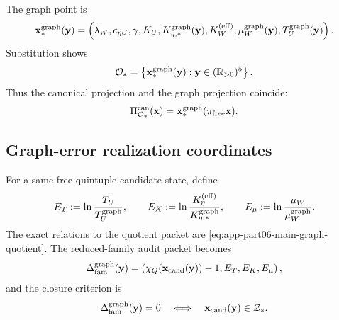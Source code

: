 The graph point is
\begin{equation}
\label{eq:app-part06-x-graph-def}
\mathbf x_*^{\rm graph}(\mathbf y)
=
\left(
\lambda_W,
 c_{\eta U},
 \gamma,
 K_U,
 K_{\eta,*}^{\rm graph}(\mathbf y),
 K_W^{(\mathrm{eff})},
 \mu_W^{\rm graph}(\mathbf y),
 T_U^{\rm graph}(\mathbf y)
\right).
\end{equation}
Substitution shows
\begin{equation}
\label{eq:app-part06-Ostar-graph}
\mathcal O_*=
\left\{
\mathbf x_*^{\rm graph}(\mathbf y):\mathbf y\in(\mathbb R_{>0})^5
\right\}.
\end{equation}
Thus the canonical projection and the graph projection coincide:
\begin{equation}
\label{eq:app-part06-can-equals-graph}
\Pi_{\mathcal O_*}^{\rm can}(\mathbf x)
=
\mathbf x_*^{\rm graph}(\pi_{\rm free}\mathbf x).
\end{equation}

\subsection{Graph-error realization coordinates}
\label{subsec:app-part06-graph-error-realization-coordinates}

For a same-free-quintuple candidate state, define
\begin{equation}
\label{eq:app-part06-graph-errors-def}
E_T:=\ln\frac{T_U}{T_U^{\rm graph}},
\qquad
E_K:=\ln\frac{K_\eta^{(\mathrm{eff})}}{K_{\eta,*}^{\rm graph}},
\qquad
E_\mu:=\ln\frac{\mu_W}{\mu_W^{\rm graph}}.
\end{equation}
The exact relations to the quotient packet are \eqref{eq:app-part06-main-graph-quotient}.  The reduced-family audit packet becomes
\begin{equation}
\label{eq:app-part06-graph-family-packet}
\Delta_{\rm fam}^{\rm graph}(\mathbf y)
=
\left(
\chi_Q(\mathbf x_{\rm cand}(\mathbf y))-1,
E_T,
E_K,
E_\mu
\right),
\end{equation}
and the closure criterion is
\begin{equation}
\label{eq:app-part06-graph-family-zero}
\Delta_{\rm fam}^{\rm graph}(\mathbf y)=0
\quad\Longleftrightarrow\quad
\mathbf x_{\rm cand}(\mathbf y)\in\mathcal Z_*.
\end{equation}


